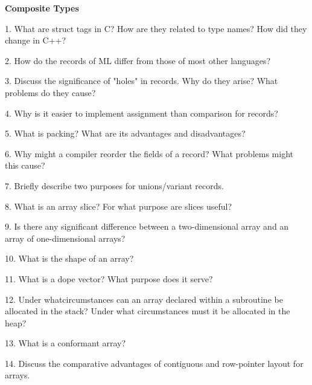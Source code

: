 \centerline{\bf Composite Types}

\vskip 1cm

1. What are struct tags in C? How are they related to type names? How did they change in C++?

\filbreak
\vskip 1cm

2. How do the records of ML differ from those of most other languages?

\filbreak
\vskip 1cm

3. Discuss the significance of "holes" in records. Why do they arise? What problems do they cause?

\filbreak
\vskip 1cm

4. Why is it easier to implement assignment than comparison for records?

\filbreak
\vskip 1cm

5. What is packing? What are its advantages and disadvantages?

\filbreak
\vskip 1cm

6. Why might a compiler reorder the fields of a record? What problems might this cause?

\filbreak
\vskip 1cm

7. Briefly describe two purposes for unions/variant records.

\filbreak
\vskip 1cm

8. What is an array slice? For what purpose are slices useful?

\filbreak
\vskip 1cm

9. Is there any significant difference between a two-dimensional array and an array of one-dimensional arrays?

\filbreak
\vskip 1cm

10. What is the shape of an array?

\filbreak
\vskip 1cm

11. What is a dope vector? What purpose does it serve?

\filbreak
\vskip 1cm

12. Under whatcircumstances can an array declared within a subroutine be allocated in the stack? Under what circumstances must it be allocated in the heap?

\filbreak
\vskip 1cm

13. What is a conformant array?

\filbreak
\vskip 1cm

14. Discuss the comparative advantages of contiguous and row-pointer layout for arrays.

\filbreak
\vskip 1cm

